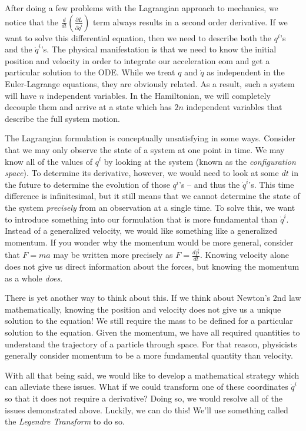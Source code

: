 After doing a few problems with the \gls{Lagrangian} approach to mechanics, we notice that the $\frac{d}{dt}\left(\frac{\partial L}{\partial \dot{q}^i}\right)$ term always results in a second order derivative. If we want to solve this differential equation, then we need to describe both the $q  ^i$'s and the $\dot{q}^i$'s. The physical manifestation is that we need to know the initial position and velocity in order to integrate our acceleration \gls{eom} and get a particular solution to the ODE. While we treat $q$ and $\dot{q}$ as independent in the Euler-Lagrange equations, they are obviously related. As a result, such a system will have $n$ independent variables. In the \gls{Hamiltonian}, we will completely decouple them and arrive at a state which has $2n$ independent variables that describe the full system motion.

The \gls{Lagrangian} formulation is conceptually unsatisfying in some ways. Consider that we may only observe the state of a system at one point in time. We may know all of the values of $q^i$ by looking at the system (known as the \textit{configuration space}). To determine its derivative, however, we would need to look at some $dt$ in the future to determine the evolution of those $q^i$'s -- and thus the $\dot{q}^i$'s. This time difference is infinitesimal, but it still means that we cannot determine the state of the system \textit{precisely} from an observation at a single time. To solve this, we want to introduce something into our formulation that is more fundamental than $\dot{q}^i$. Instead of a generalized velocity, we would like something like a generalized momentum. If you wonder why the momentum would be more general, consider that $F=ma$ may be written more precisely as $F=\frac{d\vec{p}}{dt}$. Knowing velocity alone does not give us direct information about the forces, but knowing the momentum as a whole \textit{does}.

There is yet another way to think about this. If we think about Newton's 2nd law mathematically, knowing the position and velocity does not give us a unique solution to the equation! We still require the mass to be defined for a particular solution to the equation. Given the momentum, we have all required quantities to understand the trajectory of a particle through space. For that reason, physicists generally consider momentum to be a more fundamental quantity than velocity.

With all that being said, we would like to develop a mathematical strategy which can alleviate these issues. What if we could transform one of these coordinates $\dot{q}^i$ so that it does not require a derivative? Doing so, we would resolve all of the issues demonstrated above. Luckily, we can do this! We'll use something called the \textit{Legendre Transform} to do so.


